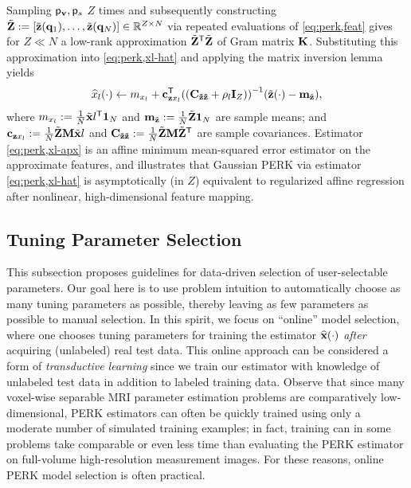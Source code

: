 Sampling $\mathsf{p}_{\mathbf{v}},\mathsf{p}_{s}$ $Z$ times
and subsequently constructing 
$\bmZt := 
	\brac{\bmztZa{\bmq_1},\dots,\bmztZa{\bmq_N}} \in \reals{Z \times N}$
via repeated evaluations of \eqref{eq:perk,feat}
gives for $Z \ll N$
a low-rank approximation $\tilde{\mathbf{Z}}^{\mathsf{T}}\tilde{\mathbf{Z}}$ 
of Gram matrix $\mathbf{K}$.
Substituting this approximation into \eqref{eq:perk,xl-hat}
and applying the matrix inversion lemma \cite{woodbury:50:imm} 
yields
\begin{align}
	\est{x}_l\paren{\cdot} \gets \mxl + 
		\cztxl\tpose\inv{\paren{\Cztzt + \rho_l\eye{Z}}} \paren{\bmztZa{\cdot}-\bmmzt},
	\label{eq:perk,xl-apx}
\end{align}
where 
$m_{x_l} := \frac{1}{N}\tilde{\mathbf{x}}{l}^{\mathsf{T}}\boldsymbol{1}_{N}$ 
and 
$\mathbf{m}_{\tilde{\mathbf{z}}} := \frac{1}{N}\tilde{\mathbf{Z}}\boldsymbol{1}_{N}$ 
are sample means; 
and
$\mathbf{c}_{\mathbf{z} x_l} := \frac{1}{N}\tilde{\mathbf{Z}}\mathbf{M}\tilde{\mathbf{x}}{l}$
and 
$\mathbf{C_{\tilde{\mathbf{z}}\tilde{\mathbf{z}}}} := \frac{1}{N}\tilde{\mathbf{Z}}\mathbf{M}\tilde{\mathbf{Z}}^{\mathsf{T}}$ 
are sample covariances.
Estimator \eqref{eq:perk,xl-apx} 
is an affine minimum mean-squared error estimator
on the approximate features,
and illustrates
that Gaussian PERK 
via estimator \eqref{eq:perk,xl-hat}
is asymptotically (in $Z$) equivalent
to regularized affine regression
after nonlinear, high-dimensional feature mapping.

\subsection{Tuning Parameter Selection}
\label{ss,perk,pract,mod}

This subsection proposes guidelines
for data-driven selection
of user-selectable parameters.
Our goal here is
to use problem intuition
to automatically choose 
as many tuning parameters as possible,
thereby leaving as few parameters as possible
to manual selection.
In this spirit,
we focus on ``online'' model selection,
where one chooses tuning parameters
for training the estimator $\esta{\bmx}{\cdot}$
\emph{after} acquiring (unlabeled) real test data.
This online approach 
can be considered a form 
of \emph{transductive learning} \cite[Ch.~8]{vapnik:98:slt}
since we train our estimator
with knowledge of unlabeled test data
in addition to labeled training data.
Observe that since
many voxel-wise separable MRI parameter estimation problems
are comparatively low-dimensional,
PERK estimators can often be quickly trained
using only a moderate number
of simulated training examples;
in fact,
training can in some problems take
comparable or even less time
than evaluating the PERK estimator
on full-volume high-resolution measurement images.
For these reasons,
online PERK model selection is often practical.

